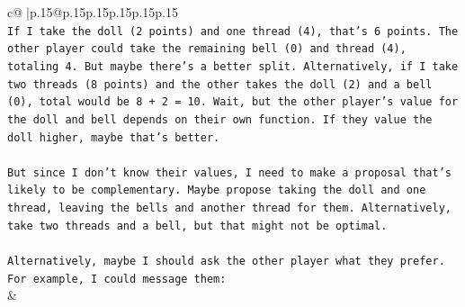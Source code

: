 \documentclass{article}
\begin{document}
{\begin{supertabular}{c@{$\;$}|p{.15\linewidth}@{}p{.15\linewidth}p{.15\linewidth}p{.15\linewidth}p{.15\linewidth}p{.15\linewidth}}
{{{\\ 
\texttt{If I take the doll (2 points) and one thread (4), that's 6 points. The other player could take the remaining bell (0) and thread (4), totaling 4. But maybe there's a better split. Alternatively, if I take two threads (8 points) and the other takes the doll (2) and a bell (0), total would be 8 + 2 = 10. Wait, but the other player's value for the doll and bell depends on their own function. If they value the doll higher, maybe that's better.} \\
\\ 
\texttt{But since I don't know their values, I need to make a proposal that's likely to be complementary. Maybe propose taking the doll and one thread, leaving the bells and another thread for them. Alternatively, take two threads and a bell, but that might not be optimal.} \\
\\ 
\texttt{Alternatively, maybe I should ask the other player what they prefer. For example, I could message them:} \\
            }
        }
    }
    & \\ \\


\end{supertabular}}
\end{document}
